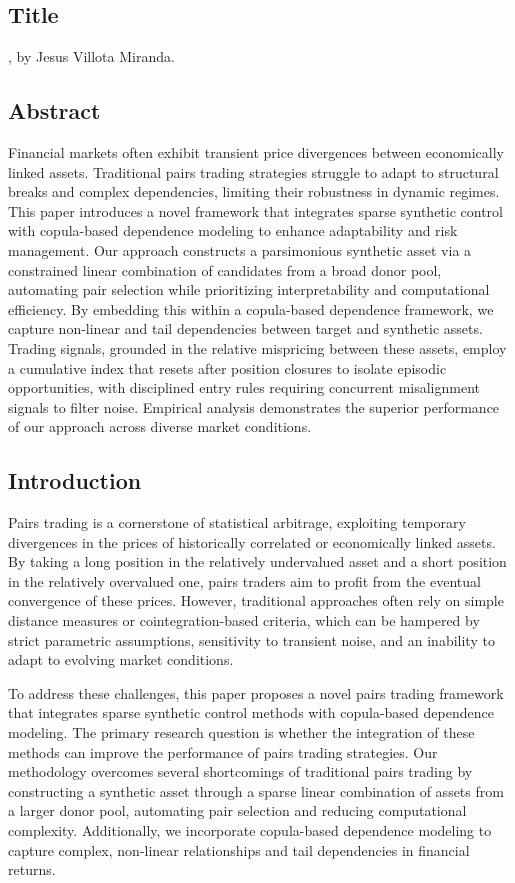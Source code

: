 \documentclass[12pt,a4paper]{article}
\begin{document}
\subsection*{Title} 
, by Jesus Villota Miranda.

\subsection*{Abstract}

Financial markets often exhibit transient price divergences between economically linked assets. Traditional pairs trading strategies struggle to adapt to structural breaks and complex dependencies, limiting their robustness in dynamic regimes. This paper introduces a novel framework that integrates sparse synthetic control with copula-based dependence modeling to enhance adaptability and risk management. Our approach constructs a parsimonious synthetic asset via a constrained linear combination of candidates from a broad donor pool, automating pair selection while prioritizing interpretability and computational efficiency. By embedding this within a copula-based dependence framework, we capture non-linear and tail dependencies between target and synthetic assets. Trading signals, grounded in the relative mispricing between these assets, employ a cumulative index that resets after position closures to isolate episodic opportunities, with disciplined entry rules requiring concurrent misalignment signals to filter noise. Empirical analysis demonstrates the superior performance of our approach across diverse market conditions.

\subsection*{Introduction}

Pairs trading is a cornerstone of statistical arbitrage, exploiting temporary divergences in the prices of historically correlated or economically linked assets. By taking a long position in the relatively undervalued asset and a short position in the relatively overvalued one, pairs traders aim to profit from the eventual convergence of these prices. However, traditional approaches often rely on simple distance measures or cointegration-based criteria, which can be hampered by strict parametric assumptions, sensitivity to transient noise, and an inability to adapt to evolving market conditions.

To address these challenges, this paper proposes a novel pairs trading framework that integrates sparse synthetic control methods with copula-based dependence modeling. The primary research question is whether the integration of these methods can improve the performance of pairs trading strategies. Our methodology overcomes several shortcomings of traditional pairs trading by constructing a synthetic asset through a sparse linear combination of assets from a larger donor pool, automating pair selection and reducing computational complexity. Additionally, we incorporate copula-based dependence modeling to capture complex, non-linear relationships and tail dependencies in financial returns.
\end{document}
